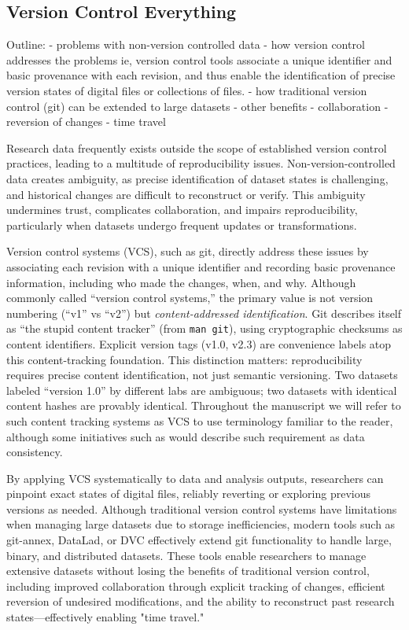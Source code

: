 \documentclass{article}
\begin{document}
\subsection{Version Control Everything}

Outline:
  - problems with non-version controlled data
  - how version control addresses the problems
    ie, version control tools associate a unique identifier and basic provenance with each revision, and thus enable the identification of precise version states of digital files or collections of files.
  - how traditional version control (git) can be extended to large datasets
  - other benefits
    - collaboration
    - reversion of changes
    - time travel

Research data frequently exists outside the scope of established version control practices, leading to a multitude of reproducibility issues.
Non-version-controlled data creates ambiguity, as precise identification of dataset states is challenging, and historical changes are difficult to reconstruct or verify.
This ambiguity undermines trust, complicates collaboration, and impairs reproducibility, particularly when datasets undergo frequent updates or transformations.

Version control systems (VCS), such as git, directly address these issues by associating each revision with a unique identifier and recording basic provenance information, including who made the changes, when, and why.
Although commonly called ``version control systems,'' the primary value is not version numbering (``v1'' vs ``v2'') but \emph{content-addressed identification}.
Git describes itself as ``the stupid content tracker'' (from \texttt{man git}), using cryptographic checksums as content identifiers.
Explicit version tags (v1.0, v2.3) are convenience labels atop this content-tracking foundation.
This distinction matters: reproducibility requires precise content identification, not just semantic versioning.
Two datasets labeled ``version 1.0'' by different labs are ambiguous; two datasets with identical content hashes are provably identical.
Throughout the manuscript we will refer to such content tracking systems as VCS to use terminology familiar to the reader, although some initiatives such as \cite{sciops-paper} would describe such requirement as data consistency.

By applying VCS systematically to data and analysis outputs, researchers can pinpoint exact states of digital files, reliably reverting or exploring previous versions as needed.
Although traditional version control systems have limitations when managing large datasets due to storage inefficiencies, modern tools such as git-annex, DataLad, or DVC effectively extend git functionality to handle large, binary, and distributed datasets.
These tools enable researchers to manage extensive datasets without losing the benefits of traditional version control, including improved collaboration through explicit tracking of changes, efficient reversion of undesired modifications, and the ability to reconstruct past research states—effectively enabling "time travel."
\end{document}
